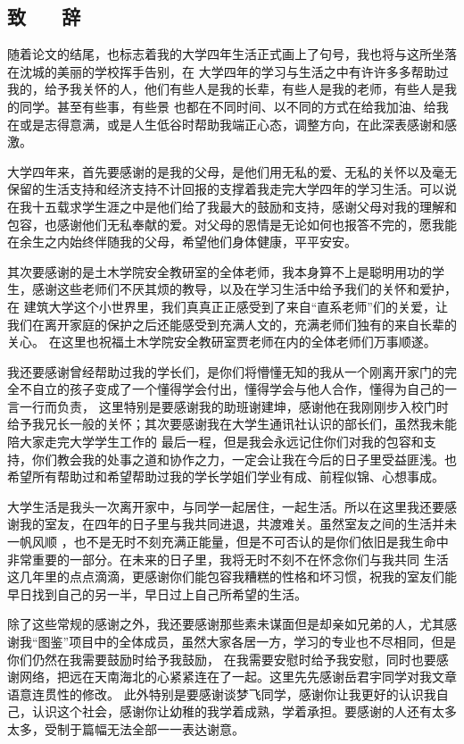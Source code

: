 \begin{center}
    \section*{  \textbf{致 ~~ 辞}}
    \end{center}

随着论文的结尾，也标志着我的大学四年生活正式画上了句号，我也将与这所坐落在沈城的美丽的学校挥手告别，在
大学四年的学习与生活之中有许许多多帮助过我的，给予我关怀的人，他们有些人是我的长辈，有些人是我的老师，有些人是我的同学。甚至有些事，有些景
也都在不同时间、以不同的方式在给我加油、给我在或是志得意满，或是人生低谷时帮助我端正心态，调整方向，在此深表感谢和感激。

大学四年来，首先要感谢的是我的父母，是他们用无私的爱、无私的关怀以及毫无保留的生活支持和经济支持不计回报的支撑着我走完大学四年的学习生活。可以说
在我十五载求学生涯之中是他们给了我最大的鼓励和支持，感谢父母对我的理解和包容，也感谢他们无私奉献的爱。对父母的恩情是无论如何也报答不完的，愿我能
在余生之内始终伴随我的父母，希望他们身体健康，平平安安。

其次要感谢的是土木学院安全教研室的全体老师，我本身算不上是聪明用功的学生，感谢这些老师们不厌其烦的教导，以及在学习生活中给予我们的关怀和爱护，在
建筑大学这个小世界里，我们真真正正感受到了来自“直系老师”们的关爱，让我们在离开家庭的保护之后还能感受到充满人文的，充满老师们独有的来自长辈的关心。
在这里也祝福土木学院安全教研室贾老师在内的全体老师们万事顺遂。

我还要感谢曾经帮助过我的学长们，是你们将懵懂无知的我从一个刚离开家门的完全不自立的孩子变成了一个懂得学会付出，懂得学会与他人合作，懂得为自己的一言一行而负责，
这里特别是要感谢我的助班谢建坤，感谢他在我刚刚步入校门时给予我兄长一般的关怀；其次要感谢我在大学生通讯社认识的部长们，虽然我未能陪大家走完大学学生工作的
最后一程，但是我会永远记住你们对我的包容和支持，你们教会我的处事之道和协作之力，一定会让我在今后的日子里受益匪浅。也希望所有帮助过和希望帮助过我的学长学姐们学业有成、前程似锦、心想事成。

大学生活是我头一次离开家中，与同学一起居住，一起生活。所以在这里我还要感谢我的室友，在四年的日子里与我共同进退，共渡难关。虽然室友之间的生活并未一帆风顺
，也不是无时不刻充满正能量，但是不可否认的是你们依旧是我生命中非常重要的一部分。在未来的日子里，我将无时不刻不在怀念你们与我共同
生活这几年里的点点滴滴，更感谢你们能包容我糟糕的性格和坏习惯，祝我的室友们能早日找到自己的另一半，早日过上自己所希望的生活。

除了这些常规的感谢之外，我还要感谢那些素未谋面但是却亲如兄弟的人，尤其感谢我“图鉴”项目中的全体成员，虽然大家各居一方，学习的专业也不尽相同，但是你们仍然在我需要鼓励时给予我鼓励，
在我需要安慰时给予我安慰，同时也要感谢网络，把远在天南海北的心紧紧连在了一起。这里先先感谢岳君宇同学对我文章语意连贯性的修改。
此外特别是要感谢谈梦飞同学，感谢你让我更好的认识我自己，认识这个社会，感谢你让幼稚的我学着成熟，学着承担。要感谢的人还有太多太多，受制于篇幅无法全部一一表达谢意。


